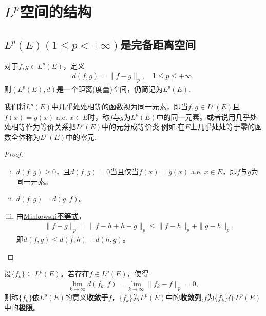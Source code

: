 \documentclass[../../main.tex]{subfiles}%
\begin{document}
\section{$L^p$空间的结构}

\subsection{$L^p(E)(1\leqslant p<+\infty)$是完备距离空间}

\begin{theorem}
对于$f,g\in L^p(E)$，定义
\begin{align*}
d(f,g)=\|f-g\|_p,\quad 1\leqslant p\leqslant+\infty,
\end{align*}
则$(L^p(E),d)$是一个距离(度量)空间，仍简记为$L^p(E)$.
\end{theorem}
\begin{remark}
我们将$L^p(E)$中几乎处处相等的函数视为同一元素，即当$f,g\in L^p(E)$且$f(x)=g(x)$ a.e. $x\in E$时，称$f$与$g$为$L^p(E)$中的同一元素。或者说用几乎处处相等作为等价关系把$L^p(E)$中的元分成等价类.例如,在$E$上几乎处处等于零的函数全体称为$L^p(E)$中的零元.
\end{remark}
\begin{proof}
\begin{enumerate}[(i)]
\item $d(f,g)\geqslant0$，且$d(f,g)=0$当且仅当$f(x)=g(x)$ a.e. $x\in E$，即$f$与$g$为同一元素。

\item $d(f,g)=d(g,f)$。

\item 由\hyperref[theorem:实变函数--Minkowski不等式]{Minkowski不等式}，
\begin{align*}
\|f-g\|_p=\|f-h+h-g\|_p
\leqslant\|f-h\|_p+\|g-h\|_p,
\end{align*}
即$d(f,g)\leqslant d(f,h)+d(h,g)$。
\end{enumerate}

\end{proof}

\begin{definition}
设$\{f_k\}\subseteq L^p(E)$。若存在$f\in L^p(E)$，使得
\begin{align*}
\lim\limits_{k\to\infty}d(f_k,f)=\lim\limits_{k\to\infty}\|f_k-f\|_p=0,
\end{align*}
则称$\{f_k\}$依$L^p(E)$的意义\textbf{收敛于}$f$，$\{f_k\}$为$L^p(E)$中的\textbf{收敛列},$f$为$\{f_k\}$在$L^p(E)$中的\textbf{极限}。
\end{definition}
\end{document}
